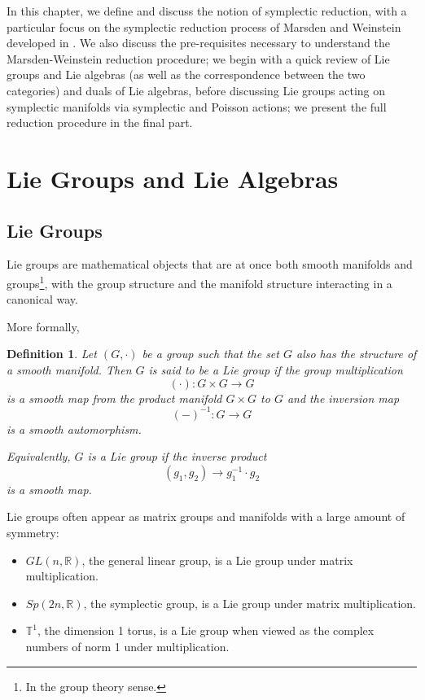 \documentclass{tufte-handout}
\newtheorem{defn}{Definition}
\begin{document}
In this chapter, we define and discuss the notion of symplectic reduction, with a particular focus on the symplectic reduction process of Marsden and Weinstein developed in \cite{marsdenweinstein}. We also discuss the pre-requisites necessary to understand the Marsden-Weinstein reduction procedure; we begin with a quick review of Lie groups and Lie algebras (as well as the correspondence between the two categories) and duals of Lie algebras, before discussing Lie groups acting on symplectic manifolds via symplectic and Poisson actions; we present the full reduction procedure in the final part.

\section{Lie Groups and Lie Algebras}
\subsection{Lie Groups}
Lie groups are mathematical objects that are at once both smooth manifolds and groups\footnote{In the group theory sense.}, with the group structure and the manifold structure interacting in a canonical way.

More formally,
\begin{fullwidth}
\begin{defn}
Let $(G,\cdot)$ be a group such that the set $G$ also has the structure of a smooth manifold. Then $G$ is said to be a \emph{Lie group} if the group multiplication
$$
(\cdot): G \times G \to G
$$
is a smooth map from the product manifold $G \times G$ to $G$ and the inversion map
$$
(-)^{-1}: G \to G
$$
is a smooth automorphism.

Equivalently, $G$ is a Lie group if the inverse product
$$
(g_1,g_2) \to g_1^{-1}\cdot g_2
$$
is a smooth map.
\end{defn}
\end{fullwidth}

Lie groups often appear as matrix groups and manifolds with a large amount of symmetry:
\begin{itemize}
\item $GL(n,\mathbb{R})$, the general linear group, is a Lie group under matrix multiplication.

\item $Sp(2n,\mathbb{R})$, the symplectic group, is a Lie group under matrix multiplication.

\item $\mathbb{T}^1$, the dimension 1 torus, is a Lie group when viewed as the complex numbers of norm 1 under multiplication.
\end{itemize}
\end{document}
